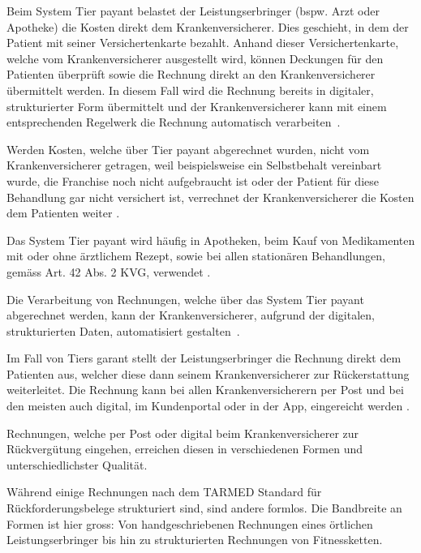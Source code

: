 \documentclass{hwz}
\begin{document}
Beim System Tier payant belastet der Leistungserbringer (bspw. Arzt oder Apotheke) die Kosten direkt dem Krankenversicherer. Dies geschieht, in dem der Patient mit seiner Versichertenkarte bezahlt. Anhand dieser Versichertenkarte, welche vom Krankenversicherer ausgestellt wird, können Deckungen für den Patienten überprüft sowie die Rechnung direkt an den Krankenversicherer übermittelt werden. In diesem Fall wird die Rechnung bereits in digitaler, strukturierter Form übermittelt und der Krankenversicherer kann mit einem entsprechenden Regelwerk die Rechnung automatisch verarbeiten~\autocite{EDI2017FaktenblattVergutungssysteme, BAG2016AntwortenVersichertenkarte}. 

Werden Kosten, welche über Tier payant abgerechnet wurden, nicht vom Krankenversicherer getragen, weil beispielsweise ein Selbstbehalt vereinbart wurde, die Franchise noch nicht aufgebraucht ist oder der Patient für diese Behandlung gar nicht versichert ist, verrechnet der Krankenversicherer die Kosten dem Patienten weiter \autocite{EDI2017FaktenblattVergutungssysteme}.

Das System Tier payant wird häufig in Apotheken, beim Kauf von Medikamenten mit oder ohne ärztlichem Rezept, sowie bei allen stationären Behandlungen, gemäss Art. 42 Abs. 2 KVG, verwendet \autocite{EDI2017FaktenblattVergutungssysteme}.

Die Verarbeitung von Rechnungen, welche über das System Tier payant abgerechnet werden, kann der Krankenversicherer, aufgrund der digitalen, strukturierten Daten, automatisiert gestalten~\autocite{BAG2016AntwortenVersichertenkarte}.

Im Fall von Tiers garant stellt der Leistungserbringer die Rechnung direkt dem Patienten aus, welcher diese dann seinem Krankenversicherer zur Rückerstattung weiterleitet. Die Rechnung kann bei allen Krankenversicherern per Post und bei den meisten auch digital, im Kundenportal oder in der App, eingereicht werden \autocite{EDI2017FaktenblattVergutungssysteme}.

Rechnungen, welche per Post oder digital beim Krankenversicherer zur Rückvergütung eingehen, erreichen diesen in verschiedenen Formen und unterschiedlichster Qualität. 

Während einige Rechnungen nach dem TARMED Standard für Rückforderungsbelege strukturiert sind, sind andere formlos. Die Bandbreite an Formen ist hier gross: Von handgeschriebenen Rechnungen eines örtlichen Leistungserbringer bis hin zu strukturierten Rechnungen von Fitnessketten.
\end{document}
